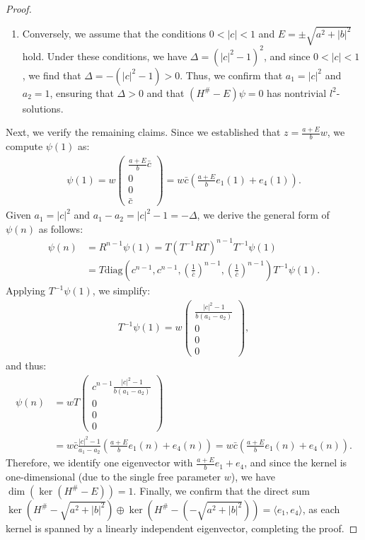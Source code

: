 \documentclass{amsart}
\theoremstyle{definition}
\theoremstyle{remark}
\begin{document}
\begin{proof}
\begin{enumerate}
    \item Conversely, we assume that the conditions \(0 < |c| < 1\) and \(E = \pm \sqrt{a^2 + |b|^2}\) hold. Under these conditions, we have \(\Delta = (|c|^2 - 1)^2\), and since \(0 < |c| < 1\), we find that \(\Delta = -(|c|^2 - 1) > 0\). Thus, we confirm that \(a_1 = |c|^2\) and \(a_2 = 1\), ensuring that \(\Delta > 0\) and that \((H^\# - E)\psi = 0\) has nontrivial \(l^2\)-solutions.
\end{enumerate}
Next, we verify the remaining claims. Since we established that \(z = \frac{a + E}{b} w\), we compute \(\psi(1)\) as:
\begin{align*}
\psi(1) = w \begin{pmatrix} \frac{a + E}{b} \bar{c} \\ 0 \\ 0 \\ \bar{c} \end{pmatrix} = w \bar{c} \left( \frac{a + E}{b} e_1(1) + e_4(1) \right).
\end{align*}
Given \(a_1 = |c|^2\) and \(a_1 - a_2 = |c|^2 - 1 = -\Delta\), we derive the general form of \(\psi(n)\) as follows:
\begin{align*}
\psi(n) &= R^{n-1} \psi(1) = T (T^{-1} R T)^{n-1} T^{-1} \psi(1) \\
&= T \text{diag}\left( c^{n-1}, c^{n-1}, \left( \frac{1}{\bar{c}} \right)^{n-1}, \left( \frac{1}{\bar{c}} \right)^{n-1} \right) T^{-1} \psi(1).
\end{align*}
Applying \(T^{-1} \psi(1)\), we simplify:
\begin{align*}
T^{-1} \psi(1) = w \begin{pmatrix} \frac{|c|^2 - 1}{b (a_1 - a_2)} \\ 0 \\ 0 \\ 0 \end{pmatrix},
\end{align*}
and thus:
\begin{align*}
\psi(n) &= w T \begin{pmatrix} c^{n-1} \frac{|c|^2 - 1}{b (a_1 - a_2)} \\ 0 \\ 0 \\ 0 \end{pmatrix} \\
&= w \bar{c} \frac{|c|^2 - 1}{a_1 - a_2} \left( \frac{a + E}{b} e_1(n) + e_4(n) \right) = w \bar{c} \left( \frac{a + E}{b} e_1(n) + e_4(n) \right).
\end{align*}
Therefore, we identify one eigenvector with \(\frac{a + E}{b} e_1 + e_4\), and since the kernel is one-dimensional (due to the single free parameter \(w\)), we have \(\dim(\ker(H^\# - E)) = 1\). Finally, we confirm that the direct sum \(\ker(H^\# - \sqrt{a^2 + |b|^2}) \oplus \ker(H^\# - (-\sqrt{a^2 + |b|^2})) = \langle e_1, e_4 \rangle\), as each kernel is spanned by a linearly independent eigenvector, completing the proof.
\end{proof}
\end{document}
